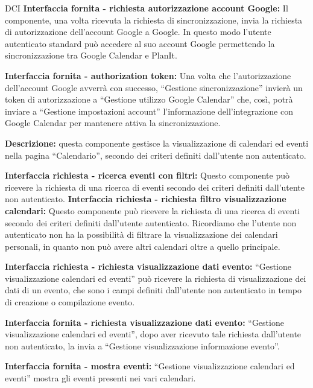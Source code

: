 \begin{listaPersonale}{DCI}
    \textbf{Interfaccia fornita - richiesta autorizzazione account Google:} Il componente, una volta ricevuta la richiesta di sincronizzazione, invia la richiesta di autorizzazione dell'account Google a Google. In questo modo l'utente autenticato standard può accedere al suo account Google permettendo la sincronizzazione tra Google Calendar e PlanIt.

    \textbf{Interfaccia fornita - authorization token:} Una volta che l'autorizzazione dell'account Google avverrà con successo, “Gestione sincronizzazione” invierà un token di autorizzazione a “Gestione utilizzo Google Calendar” che, così, potrà inviare a “Gestione impostazioni account” l'informazione dell'integrazione con Google Calendar per mantenere attiva la sincronizzazione.



    \textbf{Descrizione:} questa componente gestisce la visualizzazione di calendari ed eventi nella pagina “Calendario”, secondo dei criteri definiti dall'utente non autenticato.

    \textbf{Interfaccia richiesta - ricerca eventi con filtri:} Questo componente può ricevere la richiesta di una ricerca di eventi secondo dei criteri definiti dall'utente non autenticato.
    \textbf{Interfaccia richiesta - richiesta filtro visualizzazione
        calendari:}  Questo componente può ricevere la richiesta di una ricerca di eventi secondo dei criteri definiti dall'utente autenticato. Ricordiamo che l'utente non autenticato non ha la possibilità di filtrare la visualizzazione dei calendari personali, in quanto non può avere altri calendari oltre a quello principale.

    \textbf{Interfaccia richiesta - richiesta visualizzazione dati evento:} “Gestione visualizzazione calendari ed eventi” può ricevere la richiesta di visualizzazione dei dati di un evento, che sono i campi definiti dall'utente non autenticato in tempo di creazione o compilazione evento.

    \textbf{Interfaccia fornita - richiesta visualizzazione dati evento:}  “Gestione visualizzazione calendari ed eventi”, dopo aver ricevuto tale richiesta dall'utente non autenticato, la invia a “Gestione visualizzazione informazione evento”.

    \textbf{Interfaccia fornita - mostra eventi:} “Gestione visualizzazione calendari ed eventi” mostra gli eventi presenti nei vari calendari.


\end{listaPersonale}
